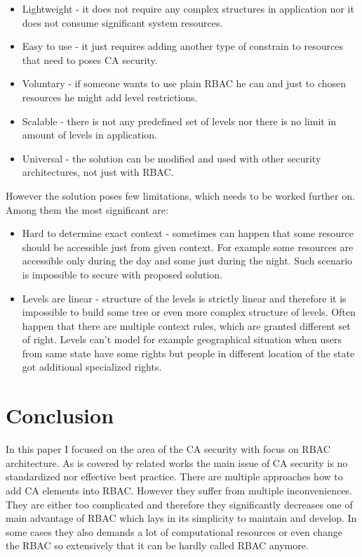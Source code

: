 \documentclass{poster15}
\begin{document}
\begin{itemize}
  \item Lightweight - it does not require any complex structures in application nor it does not consume significant system resources.
  
  \item Easy to use - it just requires adding another type of constrain to resources that need to poses CA security.
  
  \item Voluntary - if someone wants to use plain RBAC he can and just to chosen resources he might add level restrictions. 
  
  \item Scalable - there is not any predefined set of levels nor there is no limit in amount of levels in application.
  
  \item Universal - the solution can be modified and used with other security architectures, not just with RBAC.
\end{itemize}

However the solution poses few limitations, which needs to be worked further on. Among them the most significant are:
\begin{itemize}
  \item Hard to determine exact context - sometimes can happen that some resource should be accessible just from given context. For example some resources are accessible only during the day and some just during the night. Such scenario is impossible to secure with proposed solution.
  
  \item Levels are linear - structure of the levels is strictly linear and therefore it is impossible to build some tree or even more complex structure of levels. Often happen that there are multiple context rules, which are granted different set of right. Levels can't model for example geographical situation when users from same state have some rights but people in different location of the state got additional specialized rights.
\end{itemize}

\section{Conclusion}

In this paper I focused on the area of the CA security with focus on RBAC architecture. As is covered by related works the main issue of CA security is no standardized nor effective best practice. There are multiple approaches how to add CA elements into RBAC. However they suffer from multiple inconveniences. They are either too complicated and therefore they significantly decreases one of main advantage of RBAC which lays in its simplicity to maintain and develop. In some cases they also demands a lot of computational resources or even change the RBAC so extensively that it can be hardly called RBAC anymore.
\end{document}
